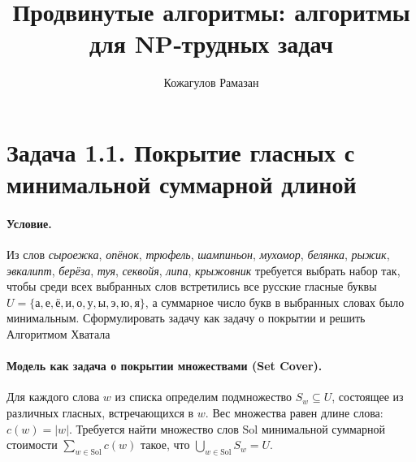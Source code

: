 \documentclass[12pt]{article}
\begin{document}
  \title{Продвинутые алгоритмы: алгоритмы для NP‑трудных задач}
  \author{Кожагулов Рамазан}
  \date{}
  \maketitle

  \section*{Задача 1.1. Покрытие гласных с минимальной суммарной длиной}

  \paragraph{Условие.}
  Из слов \emph{сыроежка}, \emph{опёнок}, \emph{трюфель}, \emph{шампиньон}, \emph{мухомор}, \emph{белянка}, \emph{рыжик}, \emph{эвкалипт}, \emph{берёза}, \emph{туя}, \emph{секвойя}, \emph{липа}, \emph{крыжовник} требуется выбрать набор так, чтобы среди всех выбранных слов встретились все русские гласные буквы \\ \(U=\{\text{а},\text{е},\text{ё},\text{и},\text{о},\text{у},\text{ы},\text{э},\text{ю},\text{я}\}\), а суммарное число букв в выбранных словах было минимальным. Сформулировать задачу как задачу о покрытии и решить Алгоритмом
Хватала

  \paragraph{Модель как задача о покрытии множествами (Set Cover).}
  Для каждого слова \(w\) из списка определим подмножество \(S_w\subseteq U\), состоящее из различных гласных, встречающихся в \(w\). Вес множества равен длине слова: \(c(w)=|w|\). Требуется найти множество слов \(\mathrm{Sol}\) минимальной суммарной стоимости \(\sum_{w\in\mathrm{Sol}} c(w)\) такое, что \(\bigcup_{w\in\mathrm{Sol}} S_w = U\). 
\end{document}
